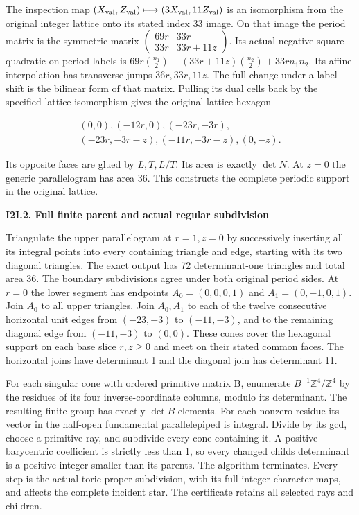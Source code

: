 The inspection map \((X_{\rm val},Z_{\rm val})\longmapsto (3X_{\rm val},11Z_{\rm val})\) is an isomorphism
from the original integer lattice onto its stated index 33 image.
On that image the period matrix is the symmetric matrix
\(\begin{pmatrix}69r&33r\\33r&33r+11z\end{pmatrix}\). Its actual negative-square quadratic
on period labels is
\(69r \binom{n_{1}}{2}+(33r+11z)\binom{n_{2}}{2}+33r n_{1} n_{2}\).
Its affine interpolation has transverse jumps \(36r,33r,11z\).
The full change under a label shift is the bilinear form of
that matrix. Pulling its dual cells back by the specified
lattice isomorphism gives the original-lattice hexagon

\[
\begin{gathered}
(0,0), (-12r,0), (-23r,-3r), \\
(-23r,-3r-z), (-11r,-3r-z), (0,-z).
\end{gathered}
\]

Its opposite faces are glued by \(L,T,L/T\). Its area is exactly
\(\operatorname{det} N\). At \(z=0\) the generic parallelogram has area 36. This
constructs the complete periodic support in the original lattice.

\par

\medskip\noindent\textbf{I2I.2. Full finite parent and actual regular subdivision}

\par\nobreak

Triangulate the upper parallelogram at \(r=1,z=0\) by successively
inserting all its integral points into every containing triangle
and edge, starting with its two diagonal triangles. The exact
output has 72 determinant-one triangles and total area 36. The
boundary subdivisions agree under both original period sides.
At \(r=0\) the lower segment has endpoints \(A_{0}=(0,0,0,1)\) and
\(A_{1}=(0,-1,0,1)\). Join \(A_{0}\) to all upper triangles. Join \(A_{0},A_{1}\) to
each of the twelve consecutive horizontal unit edges from
\((-23,-3)\) to \((-11,-3)\), and to the remaining diagonal edge from
\((-11,-3)\) to \((0,0)\). These cones cover the hexagonal support on
each base slice \(r,z\ge 0\) and meet on their stated common faces.
The horizontal joins have determinant 1 and the diagonal join
has determinant 11.

For each singular cone with ordered primitive matrix B, enumerate
\(B^{-1} \mathbb Z^4/\mathbb Z^4\) by the residues of its four inverse-coordinate
columns, modulo its determinant. The resulting finite group has
exactly \(\operatorname{det} B\) elements. For each nonzero residue its vector in
the half-open fundamental parallelepiped is integral. Divide by
its gcd, choose a primitive ray, and subdivide every cone
containing it. A positive barycentric coefficient is strictly
less than 1, so every changed child\textquotesingle s determinant is a positive
integer smaller than its parent\textquotesingle s. The algorithm terminates.
Every step is the actual toric proper subdivision, with its
full integer character maps, and affects the complete incident
star. The certificate retains all selected rays and children.

